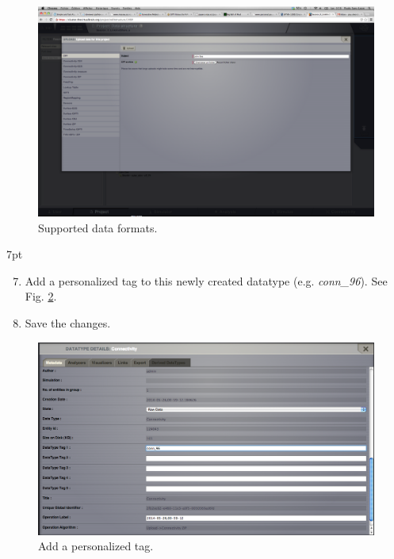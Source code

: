 \documentclass{tufte-handout}
\newenvironment{formal}{%
  \def\FrameCommand{%
    \hspace{1pt}%
    {\color{DarkBlue}\vrule width 2pt}%
    {\color{formalshade}\vrule width 4pt}%
    \colorbox{formalshade}%
  }%
  \MakeFramed{\advance\hsize-\width\FrameRestore}%
  \noindent\hspace{-4.55pt}%
  \begin{adjustwidth}{}{7pt}%
  \vspace{2pt}\vspace{2pt}%
}
{%
  \vspace{2pt}\end{adjustwidth}\endMakeFramed%
}
\begin{document}
\begin{figure}[h]
  \includegraphics[width=\linewidth]{Handout_UI_LinkAndShare_Uploaders}%
  \caption{Supported data formats.}%
  \label{fig:uploaders}%
\end{figure}


\begin{formal}
\begin{enumerate}[resume]
\setcounter{enumi}{6}
\item Add a personalized tag to this newly created datatype (e.g. \textit{conn\_96}).  See Fig. \ref{fig:tag}. 
\item Save the changes.
\end{enumerate}
\end{formal}

\begin{figure}[h]
  \includegraphics[width=\linewidth]{Handout_UI_LinkAndShare_TagDatatype}%
  \caption{Add a personalized tag.}%
  \label{fig:tag}%
\end{figure}
\end{document}
